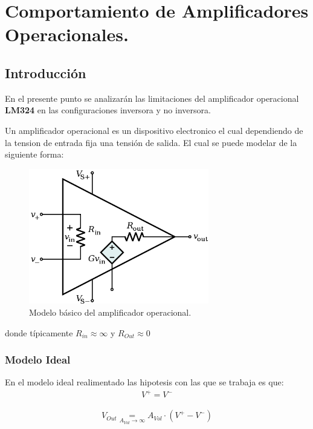 
\newcommand\underrel[2]{\mathrel{\mathop{#2}\limits_{#1}}}



\section{Comportamiento de Amplificadores Operacionales.}

\subsection{Introducción}
En el presente punto se analizarán las limitaciones del amplificador operacional  \textbf{LM324} en las configuraciones inversora y no inversora.

Un amplificador operacional es un dispositivo electronico el cual dependiendo de la tension de entrada fija una tensión de salida.
El cual se puede modelar de la siguiente forma:
\begin{figure}[H]	
	\centering
	\includegraphics[width=0.7\textwidth]{Ejercicio1/Imagenes/Basicopamp.png}
	\caption{Modelo básico del amplificador operacional.}
	\label{fig:Basicopamp}
\end{figure}
donde típicamente $R_{in}\approx \infty$ y $R_{Out} \approx 0$
\subsubsection{Modelo Ideal}
En el modelo ideal realimentado las hipotesis con las que se trabaja es que:
\begin{align}
V^+ = V^-\end{align}

\begin{align}V_{Out} \underrel{A_{Vol}\to \infty}{=} A_{Vol} \cdot (V^+ - V^-)\end{align}

